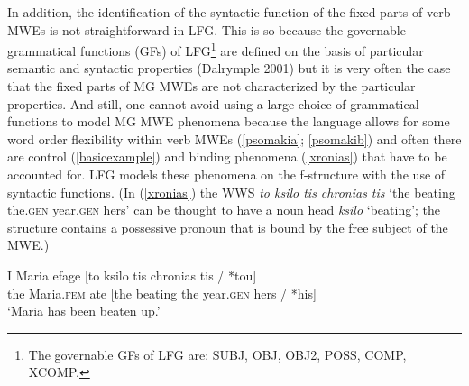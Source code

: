 \documentclass[output=paper,
modfonts
]{langscibook}
\begin{document}
      
In addition, the identification of the syntactic function of the fixed parts of verb MWEs is not straightforward in LFG. This is so because the governable grammatical functions (GFs) of LFG\footnote{The governable GFs of LFG are: SUBJ, OBJ, OBJ2, POSS, COMP, XCOMP.} are defined on the basis of particular semantic and syntactic properties (Dalrymple 2001) but it is very often the case that the fixed parts of MG MWEs are not characterized by the particular properties. And still, one cannot avoid using a large choice of grammatical functions to model MG MWE phenomena because the language allows for some word order flexibility within verb MWEs (\ref{psomakia}; \ref{psomakib})  and often there are control (\ref{basicexample}) and binding phenomena (\ref{xronias}) that have to be accounted for. LFG models these phenomena on the f-structure with the use of syntactic functions. (In (\ref{xronias}) the WWS \textit{to ksilo tis chronias tis} `the beating the.\textsc{gen} year.\textsc{gen}  hers' can be thought to have a noun head \textit{ksilo} `beating'; the structure contains a possessive pronoun that is bound by the free subject of the MWE.)

\ea\label{xronias}
\gll I Maria             efage  [to ksilo        tis     chronias       tis    / *tou]\\
           the Maria.\textsc{fem} ate       [the beating  the    year.\textsc{gen}    hers  / *his]\\
\glt `Maria has been beaten up.'
\z
\end{document}

